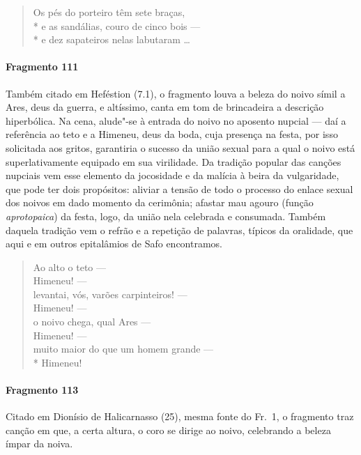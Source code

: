 {\begin{verse}
Os pés do porteiro têm sete braças,\\*
e as sandálias, couro de cinco bois --- \\*
e dez sapateiros nelas labutaram \ldots{}
\end{verse}

\paragraph{Fragmento 111}

{\small Também citado em Heféstion (7.1), o fragmento louva a beleza do noivo símil a Ares,
deus da guerra, e altíssimo, canta em tom de brincadeira a descrição
hiperbólica. Na cena, alude"-se à entrada do noivo no aposento nupcial --- daí a
referência ao teto e a Himeneu, deus da boda, cuja presença na festa, por isso
solicitada aos gritos, garantiria o sucesso da união sexual para a qual o noivo está superlativamente equipado em sua virilidade. Da tradição popular das canções nupciais vem esse elemento da jocosidade e da malícia à beira da vulgaridade, que pode ter dois propósitos: aliviar a tensão de todo o processo do enlace sexual dos noivos em dado momento da cerimônia; afastar mau agouro (função \textit{aprotopaica}) da festa, logo, da união nela celebrada e consumada. Também daquela tradição vem o refrão e a repetição de palavras, típicos da oralidade, que aqui e em outros epitalâmios de Safo encontramos.}

\begin{verse}
Ao alto o teto --- \\
Himeneu! --- \\
levantai, vós, varões carpinteiros! --- \\
Himeneu! --- \\
o noivo chega, qual Ares --- \\
Himeneu! --- \\
muito maior do que um homem grande ---\\*
Himeneu!
\end{verse}

\paragraph{Fragmento 113}

{\small Citado em Dionísio de Halicarnasso (25), mesma fonte do Fr.~1, o fragmento traz canção em que, a certa altura, o coro se dirige ao noivo, celebrando a beleza ímpar da noiva.}

}
